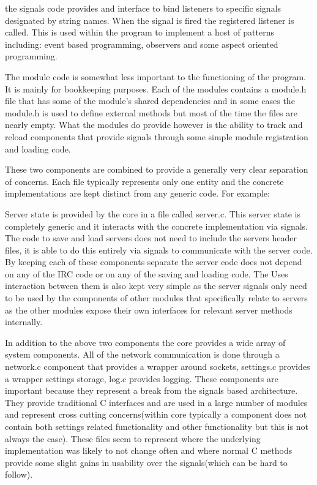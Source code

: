 \documentclass{acm_proc_article-sp}
\begin{document}
the signals code provides and interface to bind listeners to specific signals designated by string names. When the signal is fired the registered listener is called. This is used within the program to implement a host of patterns including: event based programming, observers and some aspect oriented programming.

The module code is somewhat less important to the functioning of the program. It is mainly for bookkeeping purposes. Each of the modules contains a module.h file that has some of the module's shared dependencies and in some cases the module.h is used to define external methods but most of the time the files are nearly empty. What the modules do provide however is the ability to track and reload components that provide signals through some simple module registration and loading code.

These two components are combined to provide a generally very clear separation of concerns. Each file typically represents only one entity and the concrete implementations are kept distinct from any generic code. For example:

Server state is provided by the core in a file called server.c. This server state is completely generic and it interacts with the concrete implementation via signals. The code to save and load servers does not need to include the servers header files, it is able to do this entirely via signals to communicate with the server code. By keeping each of these components separate the server code does not depend on any of the IRC code or on any of the saving and loading code. The Uses interaction between them is also kept very simple as the server signals only need to be used by the components of other modules that specifically relate to servers as the other modules expose their own interfaces for relevant server methods internally.

In addition to the above two components the core provides a wide array of system components. All of the network communication is done through a network.c component that provides a wrapper around sockets, settings.c provides a wrapper settings storage, log.c provides logging. These components are important because they represent a break from the signals based architecture. They provide traditional C interfaces and are used in a large number of modules and represent cross cutting concerns(within core typically a component does not contain both settings related functionality and other functionality but this is not always the case). These files seem to represent where the underlying implementation was likely to not change often and where normal C methods provide some slight gains in usability over the signals(which can be hard to follow).
\end{document}
